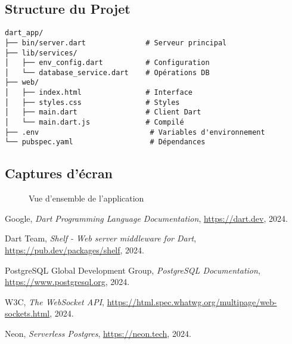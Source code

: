 \documentclass{article}
\begin{document}
\subsection{Structure du Projet}

\begin{verbatim}
dart_app/
├── bin/server.dart              # Serveur principal
├── lib/services/
│   ├── env_config.dart          # Configuration
│   └── database_service.dart    # Opérations DB
├── web/
│   ├── index.html               # Interface
│   ├── styles.css               # Styles
│   ├── main.dart                # Client Dart
│   └── main.dart.js             # Compilé
├── .env                          # Variables d'environnement
└── pubspec.yaml                  # Dépendances
\end{verbatim}

\subsection{Captures d'écran}

\begin{figure}[H]
    \centering
    \caption{Vue d'ensemble de l'application}
\end{figure}

\clearpage
\begin{thebibliography}{9}

Google, \textit{Dart Programming Language Documentation}, \url{https://dart.dev}, 2024.

Dart Team, \textit{Shelf - Web server middleware for Dart}, \url{https://pub.dev/packages/shelf}, 2024.

PostgreSQL Global Development Group, \textit{PostgreSQL Documentation}, \url{https://www.postgresql.org}, 2024.

W3C, \textit{The WebSocket API}, \url{https://html.spec.whatwg.org/multipage/web-sockets.html}, 2024.

Neon, \textit{Serverless Postgres}, \url{https://neon.tech}, 2024.

\end{thebibliography}
\end{document}
